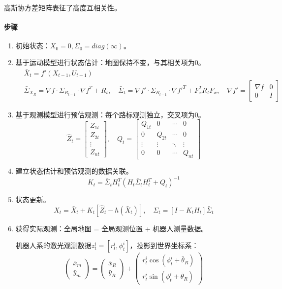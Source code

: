 \documentclass[
12pt, %
a4paper, 
oneside, %
headinclude,footinclude, %
]{scrartcl}
\begin{document}
高斯协方差矩阵表征了高度互相关性。
\paragraph{步骤}
\begin{enumerate}
\item 初始状态：$ X_0 = 0, \Sigma_0 = diag(\infty) $。
\item 基于运动模型进行状态估计：地图保持不变，与其相关项为$ 0 $。
\begin{align*}
&\bar{X}_t = f'(X_{t - 1}, U_{t - 1}) \\
&\bar{\Sigma}_{X_R} = \nabla f \cdot \Sigma_{R_{t - 1}} \cdot \nabla f^T + R_t, \quad
\bar{\Sigma}_t = \nabla f' \cdot \Sigma_{R_{t - 1}} \cdot \nabla f'^T + F_x^T R_t F_x, \quad
\nabla f' = \begin{bmatrix} \nabla f & 0 \\ 0 & I \end{bmatrix}
\end{align*}
\item 基于观测模型进行预估观测：每个路标观测独立，交叉项为$ 0 $。
$$
\hat{Z}_t = \begin{bmatrix} Z_{1t} \\ Z_{2t} \\ \vdots \\ Z_{nt} \end{bmatrix}, \quad
Q_t = \begin{bmatrix} Q_{1t} & 0 & \cdots & 0 \\ 0 & Q_{2t} & \cdots & 0 \\ \vdots & \vdots & \ddots & \vdots \\ 0 & 0 & \cdots & Q_{nt} \end{bmatrix}
$$
\item 建立状态估计和预估观测的数据关联。
$$ K_t = \bar{\Sigma}_t H_t^T (H_t \bar{\Sigma}_t H_t^T + Q_t)^{-1} $$
\item 状态更新。
$$ 
X_t = \bar{X}_t + K_t[\hat{Z}_t - h(\bar{X}_t)], \quad
\Sigma_t = [I - K_t H_t]\bar{\Sigma}_t 
$$
\item 获得实际观测：全局地图 = 全局观测位置 + 机器人测量数据。

机器人系的激光观测数据$ z^i_t = [r_t^i, \phi_t^i] $，投影到世界坐标系：
$$ \begin{pmatrix} \bar{x}_m \\ \bar{y}_m \end{pmatrix} = \begin{pmatrix} \bar{x}_R \\ \bar{y}_R \end{pmatrix} + \begin{pmatrix} r_t^i \cos (\phi_t^i + \bar{\theta}_R) \\ r_t^i \sin (\phi_t^i + \bar{\theta}_R) \end{pmatrix} $$


\end{enumerate}
\end{document}
